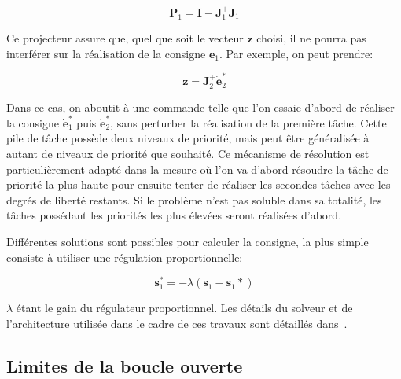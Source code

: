 \begin{equation}
  \mathbf{P}_1 = \mathbf{I} - \mathbf{J}_1^{+} \mathbf{J}_1
\end{equation}

Ce projecteur assure que, quel que soit le vecteur $\mathbf{z}$
choisi, il ne pourra pas interférer sur la réalisation de la consigne
$\dot{\mathbf{e}}_1$. Par exemple, on peut prendre:

\begin{equation}
  \mathbf{z} = \mathbf{J}_2^{+} \dot{\mathbf{e}}_2^{*}
\end{equation}

Dans ce cas, on aboutit à une commande telle que l'on essaie d'abord
de réaliser la consigne $\dot{\mathbf{e}}_1^{*}$ puis
$\dot{\mathbf{e}}_2^{*}$, sans perturber la réalisation de la première
tâche. Cette pile de tâche possède deux niveaux de priorité, mais peut
être généralisée à autant de niveaux de priorité que souhaité. Ce
mécanisme de résolution est particulièrement adapté dans la mesure où
l'on va d'abord résoudre la tâche de priorité la plus haute pour
ensuite tenter de réaliser les secondes tâches avec les degrés de
liberté restants. Si le problème n'est pas soluble dans sa totalité,
les tâches possédant les priorités les plus élevées seront réalisées
d'abord.


Différentes solutions sont possibles pour calculer la consigne, la
plus simple consiste à utiliser une régulation proportionnelle:

\begin{equation}
  \mathbf{s}_1^{*} = -\lambda (\mathbf{s}_1 - \mathbf{s}_1{*})
\end{equation}

$\lambda$ étant le gain du régulateur proportionnel. Les détails du
solveur et de l'architecture utilisée dans le cadre de ces travaux
sont détaillés dans \cite{09mansard.icar}.


\subsection{Limites de la boucle ouverte}

